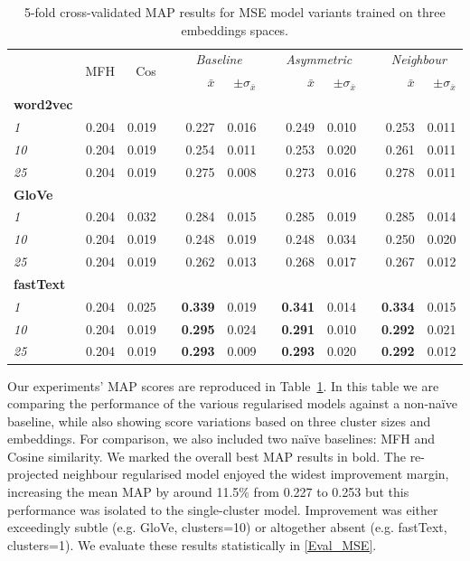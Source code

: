 \begin{table}\centering
\begin{tabular}{@{}lrrcrrcrrcrr@{}}\toprule
& \multirow{2}{*}{MFH} & \multirow{2}{*}{Cos} & \phantom{a} &  \multicolumn{2}{c}{\textit{Baseline}} & \phantom{a} & \multicolumn{2}{c}{\textit{Asymmetric}} & \phantom{a} & \multicolumn{2}{c}{\textit{Neighbour}}\\
\cmidrule{5-6} \cmidrule{8-9} \cmidrule{11-12}
&  &  && $\bar{x}$ & $\pm\sigma_{\bar{x}}$ && $\bar{x}$ & $\pm\sigma_{\bar{x}}$ && $\bar{x}$ & $\pm\sigma_{\bar{x}}$ \\ \midrule
\textbf{word2vec}\\
\textit{1} & 0.204 & 0.019 && 0.227 & 0.016 && 0.249 & 0.010 && 0.253 & 0.011 \\
\textit{10} & 0.204 & 0.019 && 0.254 & 0.011 && 0.253 & 0.020 && 0.261 & 0.011 \\
\textit{25} & 0.204 & 0.019 && 0.275 & 0.008 && 0.273 & 0.016 && 0.278 & 0.011 \\
\cmidrule{2-12}
\textbf{GloVe}\\
\textit{1} & 0.204 & 0.032 && 0.284 & 0.015 && 0.285 & 0.019 && 0.285 & 0.014 \\
\textit{10} & 0.204 & 0.019 && 0.248 & 0.019 && 0.248 & 0.034 && 0.250 & 0.020 \\
\textit{25} & 0.204 & 0.019 && 0.262 & 0.013 && 0.268 & 0.017 && 0.267 & 0.012 \\
\cmidrule{2-12}
\textbf{fastText}\\
\textit{1} & 0.204 & 0.025 && \textbf{0.339} & 0.019 && \textbf{0.341} & 0.014 && \textbf{0.334} & 0.015 \\
\textit{10} & 0.204 & 0.019 && \textbf{0.295} & 0.024 && \textbf{0.291} & 0.010 && \textbf{0.292} & 0.021 \\
\textit{25} & 0.204 & 0.019 && \textbf{0.293} & 0.009 && \textbf{0.293} & 0.020 && \textbf{0.292} & 0.012 \\
\bottomrule
\end{tabular}
\caption{5-fold cross-validated MAP results for MSE model variants trained on three embeddings spaces.}\label{tab:map_mse}
\end{table}
Our experiments' \ac{MAP} scores are reproduced in Table~\ref{tab:map_mse}.  In this table we are comparing the performance of the various regularised models against a non-na\"ive baseline, while also showing score variations based on three cluster sizes and embeddings.  For comparison, we also included two na\"ive baselines: MFH and Cosine similarity.  We marked the overall best \ac{MAP} results in bold.  The re-projected neighbour regularised model enjoyed the widest improvement margin, increasing the mean \ac{MAP} by around 11.5\% from 0.227 to 0.253 but this performance was isolated to the single-cluster model.  Improvement was either exceedingly subtle (e.g. GloVe, clusters=10) or altogether absent (e.g. fastText, clusters=1).  We evaluate these results statistically in \cref{Eval_MSE}.

